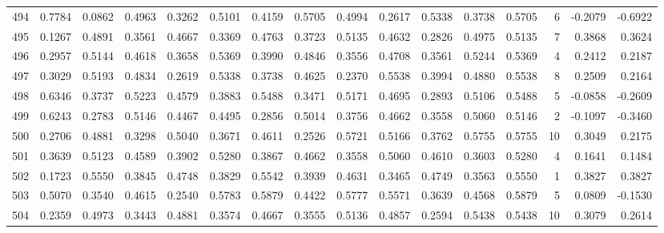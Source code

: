 \begin{tabular}{lrrrrrrrrrrrrrrr}
494 &      0.7784 &  0.0862 &  0.4963 &  0.3262 &  0.5101 &  0.4159 &  0.5705 &  0.4994 &  0.2617 &  0.5338 &   0.3738 &     0.5705 &      6 &                   -0.2079 &                    -0.6922 \\
495 &      0.1267 &  0.4891 &  0.3561 &  0.4667 &  0.3369 &  0.4763 &  0.3723 &  0.5135 &  0.4632 &  0.2826 &   0.4975 &     0.5135 &      7 &                    0.3868 &                     0.3624 \\
496 &      0.2957 &  0.5144 &  0.4618 &  0.3658 &  0.5369 &  0.3990 &  0.4846 &  0.3556 &  0.4708 &  0.3561 &   0.5244 &     0.5369 &      4 &                    0.2412 &                     0.2187 \\
497 &      0.3029 &  0.5193 &  0.4834 &  0.2619 &  0.5338 &  0.3738 &  0.4625 &  0.2370 &  0.5538 &  0.3994 &   0.4880 &     0.5538 &      8 &                    0.2509 &                     0.2164 \\
498 &      0.6346 &  0.3737 &  0.5223 &  0.4579 &  0.3883 &  0.5488 &  0.3471 &  0.5171 &  0.4695 &  0.2893 &   0.5106 &     0.5488 &      5 &                   -0.0858 &                    -0.2609 \\
499 &      0.6243 &  0.2783 &  0.5146 &  0.4467 &  0.4495 &  0.2856 &  0.5014 &  0.3756 &  0.4662 &  0.3558 &   0.5060 &     0.5146 &      2 &                   -0.1097 &                    -0.3460 \\
500 &      0.2706 &  0.4881 &  0.3298 &  0.5040 &  0.3671 &  0.4611 &  0.2526 &  0.5721 &  0.5166 &  0.3762 &   0.5755 &     0.5755 &     10 &                    0.3049 &                     0.2175 \\
501 &      0.3639 &  0.5123 &  0.4589 &  0.3902 &  0.5280 &  0.3867 &  0.4662 &  0.3558 &  0.5060 &  0.4610 &   0.3603 &     0.5280 &      4 &                    0.1641 &                     0.1484 \\
502 &      0.1723 &  0.5550 &  0.3845 &  0.4748 &  0.3829 &  0.5542 &  0.3939 &  0.4631 &  0.3465 &  0.4749 &   0.3563 &     0.5550 &      1 &                    0.3827 &                     0.3827 \\
503 &      0.5070 &  0.3540 &  0.4615 &  0.2540 &  0.5783 &  0.5879 &  0.4422 &  0.5777 &  0.5571 &  0.3639 &   0.4568 &     0.5879 &      5 &                    0.0809 &                    -0.1530 \\
504 &      0.2359 &  0.4973 &  0.3443 &  0.4881 &  0.3574 &  0.4667 &  0.3555 &  0.5136 &  0.4857 &  0.2594 &   0.5438 &     0.5438 &     10 &                    0.3079 &                     0.2614 \\

\end{tabular}
